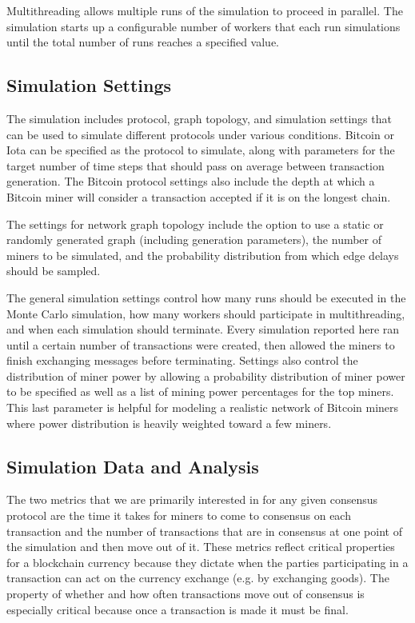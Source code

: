 \documentclass[letterpaper,11pt]{article}
\begin{document}
Multithreading allows multiple runs of the simulation to proceed in parallel. The simulation starts up a configurable number of workers that each run simulations until the total number of runs reaches a specified value.

\subsection{Simulation Settings}
The simulation includes protocol, graph topology, and simulation settings that can be used to simulate different protocols under various conditions. Bitcoin or Iota can be specified as the protocol to simulate, along with parameters for the target number of time steps that should pass on average between transaction generation. The Bitcoin protocol settings also include the depth at which a Bitcoin miner will consider a transaction accepted if it is on the longest chain.

The settings for network graph topology include the option to use a static or randomly generated graph (including generation parameters), the number of miners to be simulated, and the probability distribution from which edge delays should be sampled.

The general simulation settings control how many runs should be executed in the Monte Carlo simulation, how many workers should participate in multithreading, and when each simulation should terminate. Every simulation reported here ran until a certain number of transactions were created, then allowed the miners to finish exchanging messages before terminating. Settings also control the distribution of miner power by allowing a probability distribution of miner power to be specified as well as a list of mining power percentages for the top miners. This last parameter is helpful for modeling a realistic network of Bitcoin miners where power distribution is heavily weighted toward a few miners.

\subsection{Simulation Data and Analysis}
The two metrics that we are primarily interested in for any given consensus protocol are the time it takes for miners to come to consensus on each transaction and the number of transactions that are in consensus at one point of the simulation and then move out of it. These metrics reflect critical properties for a blockchain currency because they dictate when the parties participating in a transaction can act on the currency exchange (e.g. by exchanging goods). The property of whether and how often transactions move out of consensus is especially critical because once a transaction is made it must be final.
\end{document}
